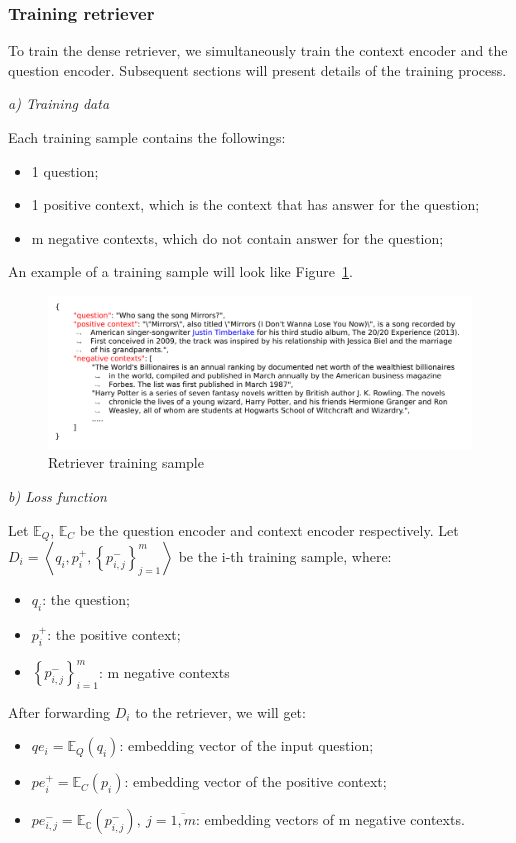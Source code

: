 \documentclass[3p, sort&compress, 12pt]{elsarticle}
\begin{document}
\subsubsection{Training retriever}
To train the dense retriever, we simultaneously train the context encoder and the question encoder. Subsequent sections will present details of the training process.
\par \textit{a) Training data}
\par Each training sample contains the followings:
\begin{itemize}
	\item 1 question;
	\item 1 positive context, which is the context that has answer for the question;
	\item m negative contexts, which do not contain answer for the question;
\end{itemize}
An example of a training sample will look like Figure~\ref{fig:05}.
\begin{figure}[!htbp]
	\centering
	\includegraphics[scale=.8]{images/PDF/retriever_sample/retriever_sample.pdf}
	\caption{Retriever training sample}
	\label{fig:05}
\end{figure}
\par \textit{b) Loss function}
\par Let $\mathbb{E}_Q$, $\mathbb{E}_C$ be the question encoder and context encoder respectively. Let $D_i = \left\langle q_i, p_i^+, \left\{p^-_{i,j}\right\}_{j=1}^m\right\rangle$ be the i-th training sample, where:
\begin{itemize}
	\item $q_i$: the question;
	\item $p_i^+$: the positive context;
	\item $\left\{p_{i, j}^-\right\}_{i=1}^m$: m negative contexts
\end{itemize}
\par After forwarding $D_i$ to the retriever, we will get:
\begin{itemize}[itemsep=5pt]
	\item $qe_i = \mathbb{E}_Q(q_i)$: embedding vector of the input question;
	\item $pe_i^+ = \mathbb{E}_C(p_i)$: embedding vector of the positive context;
	\item $pe_{i,j}^- = \mathbb{E_C}(p_{i,j}^-), \: j = \overline{1, m}$: embedding vectors of m negative contexts.
\end{itemize}
\end{document}
